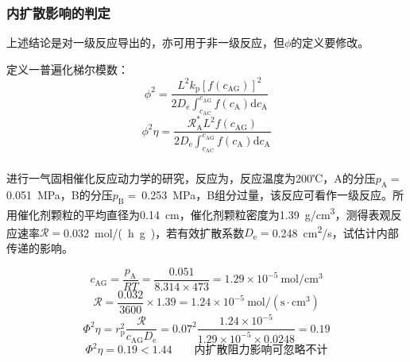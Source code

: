 \begin{frame}
    \frametitle{内扩散影响的判定}

    上述结论是对一级反应导出的，亦可用于非一级反应，但$\phi$的定义要修改。
    
    定义一普遍化梯尔模数：
    \[
        \phi^{2}=\frac{L^{2} k_{\mathrm{p}}\left[f(c_{\mathrm{AG}})\right]^{2}}{2 D_{\mathrm{e}} \int_{c_{\mathrm{AC}}}^{c_{\mathrm{AG}}} f(c_{\mathrm{A}}) \mathrm{d} c_{\mathrm{A}}}
    \]
    \[
        \phi^{2} \eta=\frac{\mathscr{R}_{\mathrm{A}}^{*} L^{2} f(c_{\mathrm{AG}})}{2 D_{\mathrm{e}} \int_{c_{\mathrm{AC}}}^{c_{\mathrm{AG}}} f(c_{\mathrm{A}}) \mathrm{d} c_{\mathrm{A}}}
    \]

\end{frame}


\begin{frame}[t]
    \frametitle{}

    \begin{example}
        进行一气固相催化反应动力学的研究，反应为，反应温度为200℃，A的分压$p_\mathrm{A} =\ $\SI{0.051}{MPa}，B的分压$p_\mathrm{B} =\ $\SI{0.253}{MPa}，B组分过量，该反应可看作一级反应。所用催化剂颗粒的平均直径为\SI{0.14}{cm}，催化剂颗粒密度为\SI{1.39}{g/cm^3}，测得表观反应速率$\mathscr{R} =$\SI{0.032}{mol/(h.g)}，若有效扩散系数$D_\mathrm{e} =$\SI{0.248}{cm^2/s}，试估计内部传递的影响。
    \end{example}\pause
    \vspace{-16pt}
    \[
        c_{\mathrm{AG}}=\frac{p_{\mathrm{A}}}{R T}=\frac{0.051}{8.314 \times 473}=1.29 \times 10^{-5} \mathrm{~mol} / \mathrm{cm}^{3}
    \]
    \[
        \mathscr{R}=\frac{0.032}{3600} \times 1.39=1.24 \times 10^{-5} \mathrm{~mol} /(\mathrm{s} \cdot \mathrm{cm}^{3})
    \]
    \[
        \Phi^{2} \eta=r_{\mathrm{p}}^{2} \frac{\mathscr{R}}{c_{\mathrm{AG}} D_{\mathrm{e}}}=0.07^{2} \frac{1.24 \times 10^{-5}}{1.29 \times 10^{-5} \times 0.0248}=0.19
    \]
    \[
        \Phi^{2} \eta=0.19<1.44 \qquad \text{内扩散阻力影响可忽略不计}
    \]

\end{frame}


